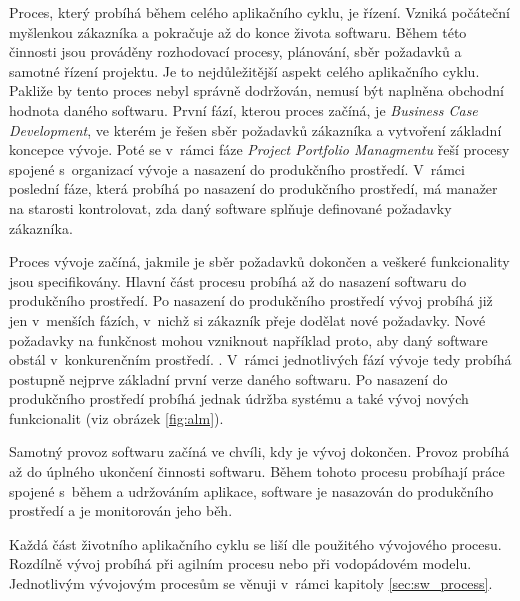 \documentclass[czech,master]{diploma}
\begin{document}
Proces, který probíhá během celého aplikačního cyklu, je řízení. Vzniká počáteční myšlenkou zákazníka a pokračuje až do konce života softwaru. Během této činnosti jsou prováděny rozhodovací procesy, plánování, sběr požadavků a samotné řízení projektu. Je to nejdůležitější aspekt celého aplikačního cyklu. Pakliže by tento proces nebyl správně dodržován, nemusí být naplněna obchodní hodnota daného softwaru. \cite{alm_chappell} První fází, kterou proces začíná, je \textit{Business Case Development}, ve kterém je řešen sběr požadavků zákazníka a vytvoření základní koncepce vývoje. Poté se v~rámci fáze \textit{Project Portfolio Managmentu} řeší procesy spojené s~organizací vývoje a nasazení do produkčního prostředí. V~rámci poslední fáze, která probíhá po nasazení do produkčního prostředí, má manažer na starosti kontrolovat, zda daný software splňuje definované požadavky zákazníka.

Proces vývoje začíná, jakmile je sběr požadavků dokončen a veškeré funkcionality jsou specifikovány. Hlavní část procesu probíhá až do nasazení softwaru do produkčního prostředí. Po nasazení do produkčního prostředí vývoj probíhá již jen v~menších fázích, v~nichž si zákazník přeje dodělat nové požadavky. Nové požadavky na funkčnost mohou vzniknout například proto, aby daný software obstál v~konkurenčním prostředí. \cite{alm_chappell}. V~rámci jednotlivých fází vývoje tedy probíhá postupně nejprve základní první verze daného softwaru. Po nasazení do produkčního prostředí probíhá jednak údržba systému a také vývoj nových funkcionalit (viz obrázek \ref{fig:alm}).

Samotný provoz softwaru začíná ve chvíli, kdy je vývoj dokončen. Provoz probíhá až do úplného ukončení činnosti softwaru. Během tohoto procesu probíhají práce spojené s~během a udržováním aplikace, software je nasazován do produkčního prostředí a je monitorován jeho běh.  \cite{alm_chappell}

Každá část životního aplikačního cyklu se liší dle použitého vývojového procesu. Rozdílně vývoj probíhá při agilním procesu nebo při vodopádovém modelu. Jednotlivým vývojovým procesům se věnuji v~rámci kapitoly \ref{sec:sw_process}.


\end{document}
